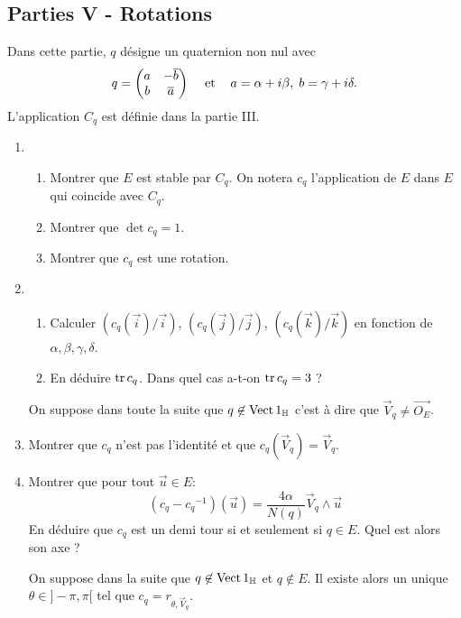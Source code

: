 \subsection*{Parties V - Rotations}
Dans cette partie, $q$ désigne un quaternion non nul avec
\begin{displaymath}
 q=\begin{pmatrix}
 a & -\overline{b}  \\ 
 b & \overline{a}
\end{pmatrix}
\hspace{0.3cm} \text{ et } \hspace{0.3cm} a=\alpha +i \beta,\; b=\gamma + i\delta.
\end{displaymath}
L'application $C_q$ est définie dans la partie III.
\begin{enumerate}
\item \begin{enumerate}
\item Montrer que $E$ est stable par $C_q$. \newline On notera $c_q$ l'application de $E$ dans $E$ qui coincide avec $C_q$.
\item Montrer que $\det c_q=1$.
\item Montrer que $c_q$ est une rotation.
\end{enumerate}
\item \begin{enumerate}
\item Calculer $(c_q(\overrightarrow{i})/\overrightarrow{i})$, $(c_q(\overrightarrow{j})/\overrightarrow{j})$, $(c_q(\overrightarrow{k})/\overrightarrow{k})$ en fonction de $\alpha , \beta , \gamma , \delta$.
\item En déduire $\operatorname{tr} c_q$. Dans quel cas a-t-on $\operatorname{tr} c_q=3$ ? 
\end{enumerate} 
On suppose dans toute la suite que $q\not \in \operatorname{Vect} 1_{\mathbb{H}}$ c'est à dire que $\overrightarrow{V}_q \neq \overrightarrow{O_E}$.
\item Montrer que $c_q$ n'est pas l'identité et que $c_q(\overrightarrow{V}_q)=\overrightarrow{V}_q$.
\item Montrer que pour tout $\overrightarrow{u} \in E$:
\[(c_q-{c_q}^{-1})(\overrightarrow{u})=\frac{4\alpha}{N(q)} \overrightarrow{V}_q \wedge \overrightarrow{u}\]
En déduire que $c_q$ est un demi tour si et seulement si $q\in E$. Quel est alors son axe ?

On suppose dans la suite que $q\not \in \operatorname{Vect} 1_{\mathbb{H}}$ et $q\not \in E$. Il existe alors un unique $\theta \in ]-\pi , \pi[$ tel que  $c_q=r_{\theta , \overrightarrow{V}_q}$.


\end{enumerate}
